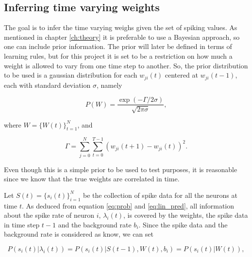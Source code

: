 


\subsection{Inferring time varying weights}
The goal is to infer the time varying weighs given the set of spiking values. As mentioned in chapter \ref{ch:theory} it is preferable to use a Bayesian approach, so one can include prior information. The prior will later be defined in terms of learning rules, but for this project it is set to be a restriction on how much a weight is allowed to vary from one time step to another. So, the prior distribution to be used is a gaussian distribution for each $w_{ji}(t)$ centered at $w_{ji}(t-1)$, each with standard deviation $\sigma$, namely

\begin{equation}
    P(W) = \frac{\exp(-\Gamma /2\sigma)}{\sqrt{2\pi \sigma}},
\end{equation}

where $W=\{W(t)\}_{t=1}^N$, and

\begin{equation}
    \Gamma = \sum_{j=0}^{N} \sum_{t=0}^{T-1} (w_{ji}(t+1)-w_{ji}(t))^2.
\end{equation}

Even though this is a simple prior to be used to test purposes, it is reasonable since we know that the true weights are correlated in time. 

Let $S(t) = \{s_i(t)\}_{i=1}^N$ be the collection of spike data for all the neurons at time $t$. As deduced from equation \ref{eq:prob} and \ref{eq:lin_pred}, all information about the spike rate of neuron $i$, $\lambda_i(t)$, is covered by the weights, the spike data in time step $t-1$ and the background rate $b_i$. Since the spike data and the background rate is considered as know, we can set

\begin{equation}
    P(s_i(t)|\lambda_i(t)) = P(s_i(t)|S(t-1),W(t), b_i) = P(s_i(t)|W(t)),
\end{equation}

